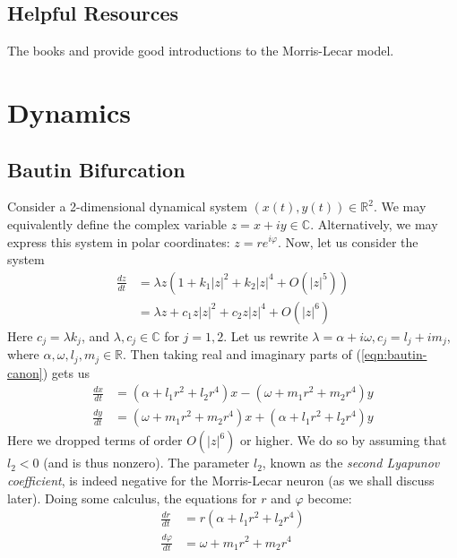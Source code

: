 \documentclass[letterpaper,12pt]{article}
\numberwithin{table}{section}
\numberwithin{figure}{section}
\numberwithin{equation}{section}
\newcommand*{\deriv}[2]{\frac{d #1}{d #2}}
\newcommand*{\abs}[1]{\left| #1 \right|}
\begin{document}
\begin{flushleft}
\begin{table}[h]
    \end{table}

    \subsection{Helpful Resources}
    The books \cite{snm} and \cite{ermentrout} provide good introductions to the Morris-Lecar model.

    \pagebreak

    \section{Dynamics}

    \subsection{Bautin Bifurcation}

    Consider a 2-dimensional dynamical system $(x(t), y(t)) \in \mathbb{R}^2$. We may equivalently define the complex variable $z = x + iy \in \mathbb{C}$. Alternatively, we may express this system in polar coordinates: $z = re^{i\varphi}$. Now, let us consider the system
    \begin{align}
        \deriv{z}{t} &= \lambda z\left(1 + k_1\abs{z}^2 + k_2\abs{z}^4 + O\left(\abs{z}^5\right)\right) \\
        \label{eqn:bautin-canon}
        &= \lambda z + c_1 z\abs{z}^2 + c_2 z\abs{z}^4 + O\left(\abs{z}^6\right)
    \end{align}
    Here $c_j = \lambda k_j$, and $\lambda, c_j \in \mathbb{C}$ for $j = 1, 2$. Let us rewrite $\lambda = \alpha + i\omega, c_j = l_j + im_j$, where $\alpha, \omega, l_j, m_j \in \mathbb{R}$. Then taking real and imaginary parts of (\ref{eqn:bautin-canon}) gets us
    \begin{align}
        \deriv{x}{t} &= (\alpha + l_1 r^2 + l_2 r^4)x - (\omega + m_1 r^2 + m_2 r^4)y \\
        \deriv{y}{t} &= (\omega + m_1 r^2 + m_2 r^4)x + (\alpha + l_1 r^2 + l_2 r^4)y
    \end{align}
    Here we dropped terms of order $O\left(\abs{z}^6\right)$ or higher. We do so by assuming that $l_2 < 0$ (and is thus nonzero). The parameter $l_2$, known as the \textit{second Lyapunov coefficient}, is indeed negative for the Morris-Lecar neuron (as we shall discuss later). Doing some calculus, the equations for $r$ and $\varphi$ become:
    \begin{align}
        \deriv{r}{t} &= r(\alpha + l_1 r^2 + l_2 r^4) \\
        \deriv{\varphi}{t} &= \omega + m_1 r^2 + m_2 r^4
    \end{align}


\end{flushleft}
\end{document}
